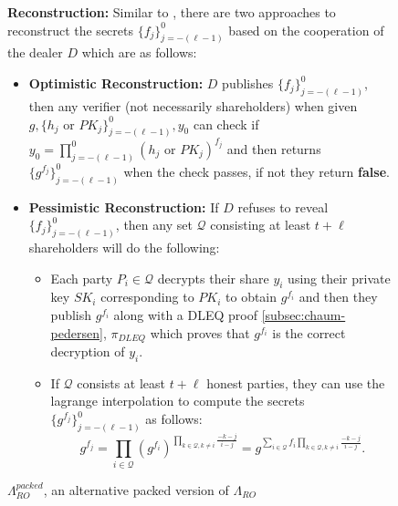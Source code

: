 \begin{figure}[H]
{\begin{tcolorbox}[title=\textbf{$\Lambda_{RO}^{packed}$}, width=1.2\textwidth, colframe=blue!75!black, colback=blue!10, sharp corners]
        \vspace{0.5em}
        \textbf{Reconstruction:}
            Similar to \cite{cryptoeprint:2025/576}, there are two approaches to reconstruct the secrets 
            $\{f_j\}_{j=-(\ell-1)}^0$ based on the cooperation of the dealer $D$ which are as follows:
            \begin{itemize}
                \item \textbf{Optimistic Reconstruction:} $D$ publishes $\{f_j\}_{j=-(\ell-1)}^0$, then any verifier (not necessarily shareholders) 
                when given $g,\{h_j\text{ or }PK_j\}_{j=-(\ell-1)}^0,y_0$ can check if $y_0=\prod_{j=-(\ell-1)}^0(h_j\text{ or }PK_j)^{f_j}$ 
                and then returns $\{g^{f_j}\}_{j=-(\ell-1)}^0$ when the check passes, if not they return \textbf{false}.
                \item \textbf{Pessimistic Reconstruction:} If $D$ refuses to reveal $\{f_j\}_{j=-(\ell-1)}^0$, then any set 
                $\mathcal{Q}$ consisting at least $t+\ell$ shareholders will do the following:
                \begin{itemize}
                    \item Each party $P_i\in\mathcal{Q}$ decrypts their share $y_i$ using their private key $SK_i$ 
                      corresponding to $PK_i$ to obtain $g^{f_i}$ and then they publish $g^{f_i}$ 
                      along with a DLEQ proof \ref{subsec:chaum-pedersen}, $\pi_{DLEQ}$ which proves that 
                      $g^{f_i}$ is the correct decryption of $y_i$.
                    \item If $\mathcal{Q}$ consists at least $t+\ell$ honest parties, they can use the 
                    lagrange interpolation to compute the secrets $\{g^{f_j}\}_{j=-(\ell-1)}^0$ as follows:
                      $$ \textstyle  g^{f_j} = \prod_{i\in\mathcal{Q}}(g^{f_i})^{\prod_{k\in\mathcal{Q},k\neq i}\frac{-k-j}{i-j}}= g^{\sum_{i\in\mathcal{Q}}f_i\prod_{k\in\mathcal{Q},k\neq i}\frac{-k-j}{i-j}}. $$
                \end{itemize}
            \end{itemize}
    \end{tcolorbox}
    }
    \caption[PPPVSS]{$\Lambda_{RO}^{packed}$, an alternative packed version of $\Lambda_{RO}$ \cite{cryptoeprint:2025/576}}
    \label{fig:packed-shamir-PPPVSS-ro}
\end{figure}
